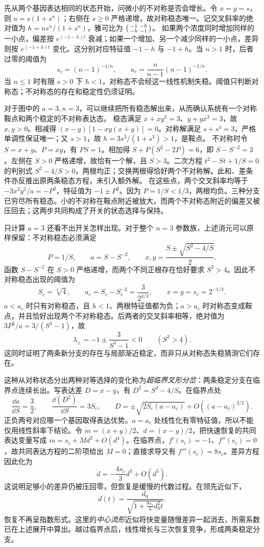 先从两个基因表达相同的状态开始，问微小的不对称是否会增长。令 $x=y=s$，则 $a=s(1+s^n)$；右侧在 $s\geq0$ 严格递增，故对称稳态唯一。记交叉斜率的绝对值为
$h=ns^n/(1+s^n)$，雅可比为 $\begin{psmallmatrix}-1&-h\\-h&-1\end{psmallmatrix}$。
如果两个浓度同时增加同样的一小点，偏差按 $e^{(-1-h)t}$ 衰减；如果一个增加、另一个减少同样的一小点，差异则按 $e^{(-1+h)t}$ 变化。这分别对应特征值 $-1-h$ 与 $-1+h$。当 $n>1$ 时，后者过零的阈值为
\[
s_c=(n-1)^{-1/n},\qquad a_c=\frac n{n-1}(n-1)^{-1/n}.
\]
当 $n\leq1$ 时有限 $s>0$ 下 $h<1$，对称态不会经这一线性机制失稳。阈值只判断对称态；不对称态的存在和稳定性仍须证明。

对于图中的 $a=3,n=3$，可以继续把所有稳态解出来，从而确认系统有一个对称鞍点和两个稳定的不对称表达态。
稳态满足 $x+xy^3=3$、$y+yx^3=3$，故 $x,y>0$。相减得
$(x-y)[1-xy(x+y)]=0$。对称解满足 $s+s^4=3$，严格单调性保证唯一；又 $s>1$，故 $h=3s^3/(1+s^3)>1$，是鞍点。
不对称时令 $S=x+y$、$P=xy$，有 $PS=1$。相加得
$S+P(S^2-2P)=6$，即 $S-S^{-2}=3$。左侧在 $S>0$ 严格递增，故恰有一个解，且 $S>3$。二次方程 $t^2-St+1/S=0$ 的判别式 $S^2-4/S>0$，两根均正；交换两根得恰好两个不对称解。此和、差条件亦反推出原两条稳态方程，未引入额外解。
在这些点，两个交叉斜率均等于 $-3x^2y^2/a=-P^2$，特征值为 $-1\pm P^2$。因为 $P=1/S<1/3$，两根均负。三种分支已穷尽所有稳态。小的不对称在鞍点附近被放大，而两个不对称态附近的偏差又被压回去；这两步共同构成了开关的状态选择与保持。

只计算 $a=3$ 还看不出开关怎样出现。对于整个 $n=3$ 参数族，上述消元可以原样保留：不对称稳态必须满足
\[
P=1/S,\qquad a=S-S^{-2},\qquad
x,y=\frac{S\pm\sqrt{S^2-4/S}}2.
\]
函数 $S-S^{-2}$ 在 $S>0$ 严格递增，而两个不同正根存在恰好要求 $S^3>4$。因此不对称稳态出现的阈值为
\[
S_c=\sqrt[3]4,\qquad a_c=S_c-S_c^{-2}=\frac3{2^{4/3}},
\qquad x=y=s_c=2^{-1/3}.
\]
$a<a_c$ 时只有对称稳态，且 $h<1$、两根特征值都为负；$a>a_c$ 时对称态变成鞍点，并且恰好出现两个不对称稳态。后两者的交叉斜率相等，绝对值为 $3P^2/a=3/(S^3-1)$，故
\[
\lambda_\pm=-1\pm\frac3{S^3-1}<0\qquad(S^3>4).
\]
这同时证明了两条新分支的存在与局部渐近稳定，而非只从对称态失稳猜测它们存在。

这种从对称状态分出两种对等选择的变化称为\emph{超临界叉形分岔}：两条稳定分支在临界点连续长出。写表达差 $D=x-y$，有 $D^2=S^2-4/S$。在临界点处
\[
\frac{\dd a}{\dd S}=\frac32,\qquad
\frac{\dd(D^2)}{\dd S}=3S_c,
\qquad
D=\pm\sqrt{2S_c(a-a_c)}+O((a-a_c)^{3/2}).
\]
正负两号对应哪一个基因取得表达优势。$a=a_c$ 处线性化有零特征值，所以不能仅用线性斜率下结论。令 $m=(x+y)/2$、$d=(x-y)/2$，把快速恢复的共同表达变量写成 $m=s_c+Md^2+O(d^4)$。在临界点，$f'(s_c)=-1$、$f''(s_c)=0$，故共同表达方程的二阶项给出 $M=0$；直接求导又有 $f'''(s_c)=8s_c$。差异方程因此化为
\[
\dot d=-\frac{4s_c}{3}d^3+O(d^5).
\]
这说明足够小的差异仍被压回零，但恢复是缓慢的代数过程。在领先近似下，
\[d(t)=\frac{d_0}{\sqrt{1+\frac{8s_c}{3}d_0^2t}}.\]
恢复不再呈指数形式。这里的\emph{中心流形}近似将快变量随慢差异一起消去，所需系数已在上述展开中算出。越过临界点后，线性增长与三次恢复竞争，形成两条稳定分支。

